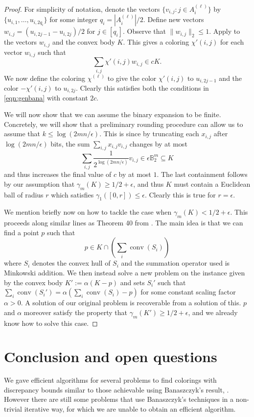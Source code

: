 \documentclass{toc}
\DeclareMathOperator{\conv}{conv}   %
\begin{document}
\begin{proof}
For simplicity of notation, denote the vectors $\{v_{i,j}: j \in A^{(\ell)}_i\}$ by $\{u_{i,1},\ldots,u_{i,2 q_i}\}$ for some integer $q_i=|A^{(\ell)}_i|/2$. Define new vectors
$w_{i,j} = \left(u_{i,2j-1}-u_{i,2j}\right)/2$ for $j \in [q_i]$.
Observe that $\| w_{i,j}\|_2 \le 1$. Apply  to the vectors $w_{i,j}$ and the convex body $K$. This gives a coloring $\chi'(i,j)$
for each vector $w_{i,j}$ such that
\[ \sum_{i,j} \chi'(i,j) w_{i,j} \in cK.  \]
We now define the coloring $\chi^{(\ell)}$ to give the color $\chi'(i,j)$ to $u_{i,2j-1}$ and the color $-\chi'(i,j)$ to $u_{i,2j}$.
Clearly this satisfies both the conditions in \eqref{eqn:genbana} with constant $2c$.

We will now show that we can assume the binary expansion to be finite. Concretely, we will show that a preliminary rounding procedure
can allow us to assume that $k \le \log(2mn/\epsilon)$. This is since by truncating each $x_{i,j}$ after $\log (2mn/\epsilon)$ bits, the sum $\sum_{i,j} x_{i,j} v_{i,j}$ changes by at most
\[\sum_{i,j} \frac{1}{2^{\log (2mn/\epsilon)}}v_{i,j} \in \epsilon \mathbb{B}_2^m \subseteq K\]
and thus increases the final value of $c$ by at most $1$. The last containment follows by our assumption that $\gamma_m(K)\ge 1/2+\epsilon$, and thus $K$ must contain a Euclidean ball of radius $r$ which satisfies $\gamma_1([0,r]) \le \epsilon$. Clearly this is true for $r=\epsilon$.

We mention briefly now on how to tackle the case when $\gamma_m(K)<1/2+\epsilon$. This proceeds along similar lines as Theorem 40 from \cite{DGLN16}. The main idea is that we can find a point $p$ such that
\[p\in K\cap \left( \sum_{i} \conv(S_i) \right)  \]
where $S_i$ denotes the convex hull of $S_i$ and the summation operator used is Minkowski addition. We then instead solve a new problem on the instance given by 
%
the convex body $K':=\alpha(K-p)$ and sets $S_i'$ such that $\sum_{i} \conv(S_i') =\alpha(\sum_{i} \conv(S_i) -p)$ for some constant scaling factor $\alpha>0$. A solution of our original problem is recoverable from a solution of this. $p$ and $\alpha$ moreover satisfy the property that $\gamma_m(K') \ge 1/2+\epsilon$, and we already know how to solve this case.
\end{proof}






\section{Conclusion and open questions}
We gave efficient algorithms for several problems to find colorings with discrepancy bounds similar to those achievable using  Banaszczyk's result, . However there are still some problems that use Banaszczyk's techniques in a non-trivial iterative way, for which we are unable to obtain an efficient algorithm.
\end{document}

